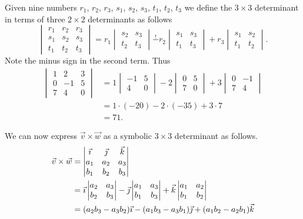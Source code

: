 Given nine numbers $r_1$, $r_2$, $r_3$, $s_1$, $s_2$, $s_3$, $t_1$, $t_2$, $t_3$ we define the $3 \times 3$ determinant in terms of three $2 \times 2$ determinants as follows
\[
\begin{vmatrix}r_1 & r_2 & r_3 \\s_1 & s_2 & s_3 \\t_1 & t_2 & t_3\end{vmatrix} 
=
r_1 \begin{vmatrix}s_2 & s_3 \\t_2 & t_3\end{vmatrix}
\stackrel{!}{-}r_2 \begin{vmatrix}s_1 & s_3 \\t_1 & t_3\end{vmatrix}
+r_3 \begin{vmatrix}s_1 & s_2 \\t_1 & t_2\end{vmatrix}.
\]
Note the minus sign in the second term.  Thus
\begin{align*}
\begin{vmatrix}1 & 2 & 3 \\0 & -1 & 5 \\7 & 4 & 0\end{vmatrix} 
& =
1 \begin{vmatrix}-1 & 5 \\4 & 0\end{vmatrix}
-2 \begin{vmatrix}0 & 5 \\7 & 0\end{vmatrix}
+3 \begin{vmatrix}0 & -1 \\7 & 4\end{vmatrix} \\
& = 1 \cdot (-20) - 2 \cdot (-35) + 3 \cdot 7 \\
& = 71.
\end{align*}

We can now express $\vec{v} \times \vec{w}$ as a symbolic $3 \times 3$ determinant as follows.
\begin{align*}
\vec{v} \times \vec{w} & =
\begin{vmatrix}
\vec\imath & \vec\jmath & \vec{k} \\
a_1 & a_2 & a_3 \\
b_1 & b_2 & b_3 
\end{vmatrix} \\
& =
\vec\imath \begin{vmatrix}a_2 & a_3 \\b_2 & b_3\end{vmatrix}
-\vec\jmath \begin{vmatrix}a_1 & a_3 \\b_1 & b_3\end{vmatrix}
+\vec{k} \begin{vmatrix}a_1 & a_2 \\b_1 & b_2\end{vmatrix} \\
& = (a_2 b_3 - a_3 b_2) \vec\imath
- (a_1 b_3 - a_3 b_1) \vec\jmath
+ (a_1 b_2 - a_2 b_1) \vec{k}
\end{align*}

